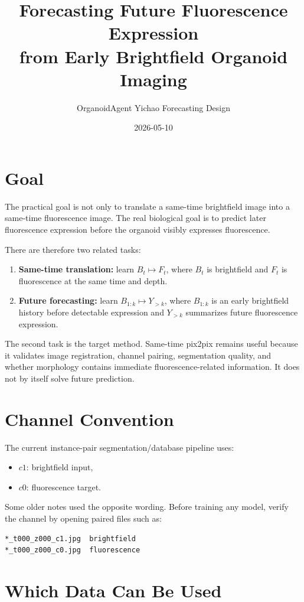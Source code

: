 \documentclass[11pt]{article}
\title{Forecasting Future Fluorescence Expression\\from Early Brightfield Organoid Imaging}
\author{OrganoidAgent Yichao Forecasting Design}
\date{2026-05-10}
\newcommand{\1}{\mathbf{1}}
\begin{document}
\maketitle
\tableofcontents

\section{Goal}
The practical goal is not only to translate a same-time brightfield image into a same-time fluorescence image. The real biological goal is to predict later fluorescence expression before the organoid visibly expresses fluorescence.

There are therefore two related tasks:
\begin{enumerate}[leftmargin=1.5em]
  \item \textbf{Same-time translation:} learn \(B_t \mapsto F_t\), where \(B_t\) is brightfield and \(F_t\) is fluorescence at the same time and depth.
  \item \textbf{Future forecasting:} learn \(B_{1:k} \mapsto Y_{>k}\), where \(B_{1:k}\) is an early brightfield history before detectable expression and \(Y_{>k}\) summarizes future fluorescence expression.
\end{enumerate}

The second task is the target method. Same-time pix2pix remains useful because it validates image registration, channel pairing, segmentation quality, and whether morphology contains immediate fluorescence-related information. It does not by itself solve future prediction.

\section{Channel Convention}
The current instance-pair segmentation/database pipeline uses:
\begin{itemize}[leftmargin=1.5em]
  \item \(c1\): brightfield input,
  \item \(c0\): fluorescence target.
\end{itemize}

Some older notes used the opposite wording. Before training any model, verify the channel by opening paired files such as:
\begin{verbatim}
*_t000_z000_c1.jpg  brightfield
*_t000_z000_c0.jpg  fluorescence
\end{verbatim}

\section{Which Data Can Be Used}
\end{document}
